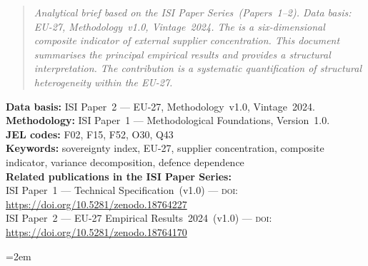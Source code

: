 \documentclass[12pt,a4paper]{article}
\begin{document}
\hypersetup{pageanchor=false}


\vspace*{-2.65cm}
\begin{abstract}
\small\noindent
\textit{Analytical brief based on the ISI Paper
Series~(Papers~1--2).  Data basis: EU-27, Methodology~v1.0,
Vintage~2024.  The \ISI is a six-dimensional composite indicator
of external supplier concentration.  This document summarises the
principal empirical results and provides a structural
interpretation.  The contribution is a systematic quantification
of structural heterogeneity within the EU-27.}
\end{abstract}
\vspace{0.05cm}
{\footnotesize
\noindent\textbf{Data basis:} ISI Paper~2 --- EU-27,
Methodology~v1.0, Vintage~2024.\\[0.02cm]
\noindent\textbf{Methodology:} ISI Paper~1 --- Methodological
Foundations, Version~1.0.\\[0.02cm]
\noindent\textbf{JEL codes:} F02, F15, F52, O30, Q43\\[0.02cm]
\noindent\textbf{Keywords:} sovereignty index, EU-27, supplier concentration,
composite indicator, variance decomposition, defence dependence\\[0.08cm]
\noindent\textbf{Related publications in the ISI Paper Series:}\\[0.02cm]
\noindent ISI Paper~1 --- Technical Specification~(v1.0) ---
\textsc{doi}: \url{https://doi.org/10.5281/zenodo.18764227}\\[0.01cm]
\noindent ISI Paper~2 --- EU-27 Empirical Results~2024~(v1.0) ---
\textsc{doi}: \url{https://doi.org/10.5281/zenodo.18764170}\par}
\isiendtitlepage
\hypersetup{pageanchor=true}



\begingroup\emergencystretch=2em

\endgroup
\end{document}
